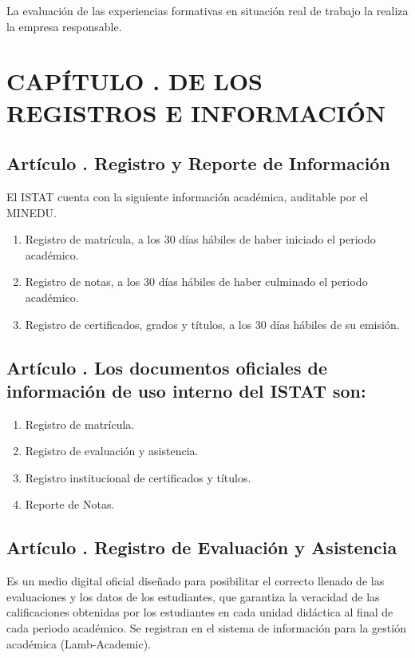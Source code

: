 La evaluación de las experiencias formativas en situación real de trabajo la realiza la empresa responsable.
\section{CAPÍTULO . DE LOS REGISTROS E INFORMACIÓN}
\addtocounter{re}{1}

\subsection{Artículo . Registro y Reporte de Información}
\addtocounter{ns}{1}
El ISTAT cuenta con la siguiente información académica, auditable por el MINEDU. 
\begin{enumerate}
\item Registro de matrícula, a los 30 días hábiles de haber iniciado el periodo académico. 
\item Registro de notas, a los 30 días hábiles de haber culminado el periodo académico. 
\item Registro de certificados, grados y títulos, a los 30 días hábiles de su emisión.
\end{enumerate}
\subsection{Artículo . Los documentos oficiales de información de uso interno del ISTAT son:}
\addtocounter{ns}{1}
\begin{enumerate}
\item Registro de matrícula. 
\item Registro de evaluación y asistencia. 
\item Registro institucional de certificados y títulos. 
\item Reporte de Notas. 
\end{enumerate}
\subsection{Artículo . Registro de Evaluación y Asistencia}
\addtocounter{ns}{1}
Es un medio digital oficial diseñado para posibilitar el correcto llenado de las evaluaciones y los datos de los estudiantes, que garantiza la veracidad de las calificaciones obtenidas por los estudiantes en cada unidad didáctica al final de cada periodo académico. Se registran en el sistema de información para la gestión académica (Lamb-Academic). 

